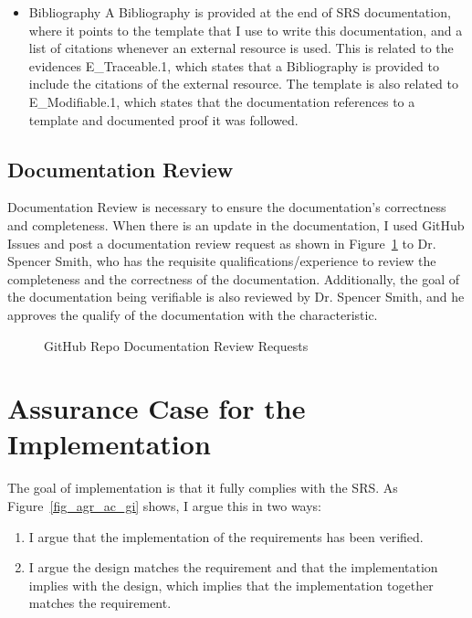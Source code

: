 \begin{itemize}
\item Bibliography
A Bibliography is provided at the end of SRS documentation, where it points to the template \cite{Smith2006} that I use to write this documentation, and a list of citations whenever an external resource is used. This is related to the evidences E\_Traceable.1, which states that a Bibliography is provided to include the citations of the external resource. The template is also related to E\_Modifiable.1, which states that the documentation references to a template and documented proof it was followed.

\end{itemize}

\subsection{Documentation Review}

Documentation Review is necessary to ensure the documentation's correctness and completeness. When there is an update in the documentation, I used GitHub Issues and post a documentation review request as shown in Figure~\ref{fig_agr_doc_review} to Dr. Spencer Smith, who has the requisite qualifications/experience to review the completeness and the correctness of the documentation. Additionally, the goal of the documentation being verifiable is also reviewed by Dr. Spencer Smith, and he approves the qualify of the documentation with the characteristic.

\begin{figure}[H]
    \centering
    \caption[GitHub Repo Documentation Review Requests]{GitHub Repo Documentation Review Requests}
    \label{fig_agr_doc_review}
\end{figure}


\section{Assurance Case for the Implementation}
The goal of implementation is that it fully complies with the SRS. As Figure~\ref{fig_agr_ac_gi} shows, I argue this in two ways:

\begin{enumerate}
  \item I argue that the implementation of the requirements has been verified.
  \item I argue the design matches the requirement and that the implementation implies with the design, which implies that the implementation together matches the requirement.
\end{enumerate}

